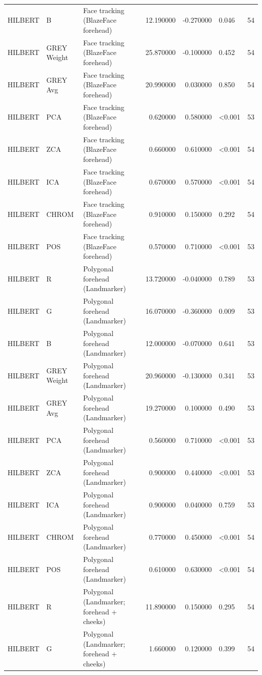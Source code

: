 \begin{table}[htbp]
\begin{tabular}{l l l r r l r}
HILBERT & B & Face tracking (BlazeFace forehead) & 12.190000 & -0.270000 & 0.046 & 54 \\
HILBERT & GREY Weight & Face tracking (BlazeFace forehead) & 25.870000 & -0.100000 & 0.452 & 54 \\
HILBERT & GREY Avg & Face tracking (BlazeFace forehead) & 20.990000 & 0.030000 & 0.850 & 54 \\
HILBERT & PCA & Face tracking (BlazeFace forehead) & 0.620000 & 0.580000 & <0.001 & 53 \\
HILBERT & ZCA & Face tracking (BlazeFace forehead) & 0.660000 & 0.610000 & <0.001 & 54 \\
HILBERT & ICA & Face tracking (BlazeFace forehead) & 0.670000 & 0.570000 & <0.001 & 54 \\
HILBERT & CHROM & Face tracking (BlazeFace forehead) & 0.910000 & 0.150000 & 0.292 & 54 \\
HILBERT & POS & Face tracking (BlazeFace forehead) & 0.570000 & 0.710000 & <0.001 & 53 \\
HILBERT & R & Polygonal forehead (Landmarker) & 13.720000 & -0.040000 & 0.789 & 53 \\
HILBERT & G & Polygonal forehead (Landmarker) & 16.070000 & -0.360000 & 0.009 & 53 \\
HILBERT & B & Polygonal forehead (Landmarker) & 12.000000 & -0.070000 & 0.641 & 53 \\
HILBERT & GREY Weight & Polygonal forehead (Landmarker) & 20.960000 & -0.130000 & 0.341 & 53 \\
HILBERT & GREY Avg & Polygonal forehead (Landmarker) & 19.270000 & 0.100000 & 0.490 & 53 \\
HILBERT & PCA & Polygonal forehead (Landmarker) & 0.560000 & 0.710000 & <0.001 & 53 \\
HILBERT & ZCA & Polygonal forehead (Landmarker) & 0.900000 & 0.440000 & <0.001 & 53 \\
HILBERT & ICA & Polygonal forehead (Landmarker) & 0.900000 & 0.040000 & 0.759 & 53 \\
HILBERT & CHROM & Polygonal forehead (Landmarker) & 0.770000 & 0.450000 & <0.001 & 54 \\
HILBERT & POS & Polygonal forehead (Landmarker) & 0.610000 & 0.630000 & <0.001 & 54 \\
HILBERT & R & Polygonal (Landmarker; forehead + cheeks) & 11.890000 & 0.150000 & 0.295 & 54 \\
HILBERT & G & Polygonal (Landmarker; forehead + cheeks) & 1.660000 & 0.120000 & 0.399 & 54 \\

\end{tabular}
\end{table}
